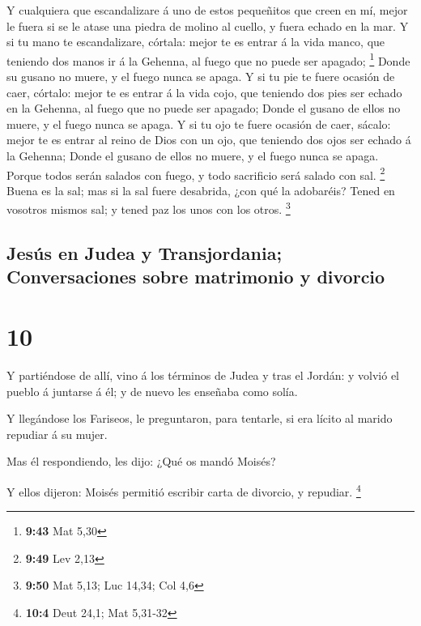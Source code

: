  Y cualquiera que escandalizare á uno de estos pequeñitos
que creen en mí, mejor le fuera si se le atase una piedra de molino al
cuello, y fuera echado en la mar.  Y si tu mano te
escandalizare, córtala: mejor te es entrar á la vida manco, que teniendo
dos manos ir á la Gehenna, al fuego que no puede ser apagado;
\footnote{\textbf{9:43} Mat 5,30}  Donde su gusano no
muere, y el fuego nunca se apaga.  Y si tu pie te fuere
ocasión de caer, córtalo: mejor te es entrar á la vida cojo, que
teniendo dos pies ser echado en la Gehenna, al fuego que no puede ser
apagado;  Donde el gusano de ellos no muere, y el fuego
nunca se apaga.  Y si tu ojo te fuere ocasión de caer,
sácalo: mejor te es entrar al reino de Dios con un ojo, que teniendo dos
ojos ser echado á la Gehenna;  Donde el gusano de ellos no
muere, y el fuego nunca se apaga.  Porque todos serán
salados con fuego, y todo sacrificio será salado con sal. \footnote{\textbf{9:49}
  Lev 2,13}  Buena es la sal; mas si la sal fuere
desabrida, ¿con qué la adobaréis? Tened en vosotros mismos sal; y tened
paz los unos con los otros. \footnote{\textbf{9:50} Mat 5,13; Luc 14,34;
  Col 4,6}

\hypertarget{jesuxfas-en-judea-y-transjordania-conversaciones-sobre-matrimonio-y-divorcio}{%
\subsection{Jesús en Judea y Transjordania; Conversaciones sobre
matrimonio y
divorcio}\label{jesuxfas-en-judea-y-transjordania-conversaciones-sobre-matrimonio-y-divorcio}}

\hypertarget{section-9}{%
\section{10}\label{section-9}}

 Y partiéndose de allí, vino á los términos de Judea y tras
el Jordán: y volvió el pueblo á juntarse á él; y de nuevo les enseñaba
como solía.

 Y llegándose los Fariseos, le preguntaron, para tentarle,
si era lícito al marido repudiar á su mujer.

 Mas él respondiendo, les dijo: ¿Qué os mandó Moisés?

 Y ellos dijeron: Moisés permitió escribir carta de
divorcio, y repudiar. \footnote{\textbf{10:4} Deut 24,1; Mat 5,31-32}


